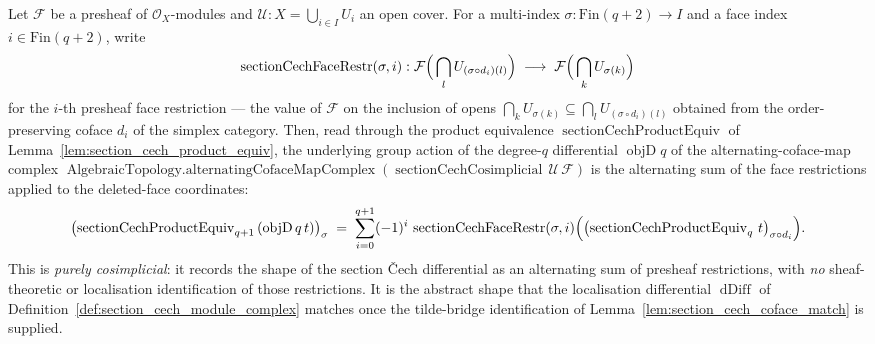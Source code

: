 \begin{lemma}
  \label{lem:section_cech_objd_apply}
  Let \(\mathcal{F}\) be a presheaf of \(\mathcal{O}_X\)-modules and
  \(\mathcal{U} : X = \bigcup_{i \in I} U_i\) an open cover. For a multi-index
  \(\sigma : \mathrm{Fin}(q+2) \to I\) and a face index
  \(i \in \mathrm{Fin}(q+2)\), write
  \[
    \operatorname{sectionCechFaceRestr}(\sigma, i) :
      \mathcal{F}\Bigl(\,\bigcap_{l} U_{(\sigma \circ d_i)(l)}\Bigr)
      \;\longrightarrow\;
      \mathcal{F}\Bigl(\,\bigcap_{k} U_{\sigma(k)}\Bigr)
  \]
  for the \(i\)-th presheaf face restriction --- the value of \(\mathcal{F}\) on the
  inclusion of opens
  \(\bigcap_{k} U_{\sigma(k)} \subseteq \bigcap_{l} U_{(\sigma \circ d_i)(l)}\)
  obtained from the order-preserving coface \(d_i\) of the simplex category. Then,
  read through the product equivalence
  \(\operatorname{sectionCechProductEquiv}\) of
  Lemma~\ref{lem:section_cech_product_equiv}, the underlying group action of the
  degree-\(q\) differential
  \(\operatorname{objD} q\) of the alternating-coface-map complex
  \(\operatorname{AlgebraicTopology.alternatingCofaceMapComplex}
  (\operatorname{sectionCechCosimplicial}\,\mathcal{U}\,\mathcal{F})\) is the alternating
  sum of the face restrictions applied to the deleted-face coordinates:
  \[
    \bigl(\operatorname{sectionCechProductEquiv}_{q+1}\,(\operatorname{objD} q\, t)\bigr)_\sigma
      \;=\;
      \sum_{i = 0}^{q+1} (-1)^i \,
        \operatorname{sectionCechFaceRestr}(\sigma, i)
          \Bigl(\bigl(\operatorname{sectionCechProductEquiv}_{q}\, t\bigr)_{\sigma \circ d_i}\Bigr).
  \]
  This is \emph{purely cosimplicial}: it records the shape of the section {\v C}ech
  differential as an alternating sum of presheaf restrictions, with \emph{no}
  sheaf-theoretic or localisation identification of those restrictions. It is the
  abstract shape that the localisation differential \(\operatorname{dDiff}\) of
  Definition~\ref{def:section_cech_module_complex} matches once the tilde-bridge
  identification of Lemma~\ref{lem:section_cech_coface_match} is supplied.
\end{lemma}

